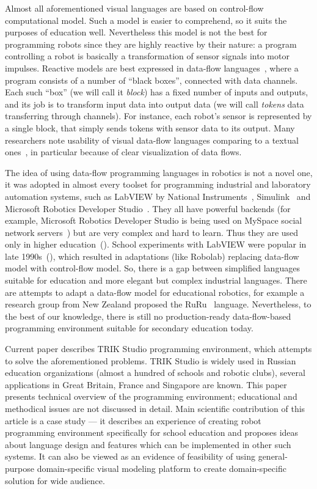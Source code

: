 \documentclass[conference]{IEEEtran}
\begin{document}
Almost all aforementioned visual languages are based on control-flow computational model. Such a model is easier to comprehend, so it suits the purposes of education well. Nevertheless this model is not the best for programming robots since they are highly reactive by their nature: a program controlling a robot is basically a transformation of sensor signals into motor impulses. Reactive models are best expressed in data-flow languages~\cite{johnston2004advances}, where a program consists of a number of ``black boxes'', connected with data channels. Each such ``box'' (we will call it \emph{block}) has a fixed number of inputs and outputs, and its job is to transform input data into output data (we will call \emph{tokens} data transferring through channels). For instance, each robot's sensor is represented by a single block, that simply sends tokens with sensor data to its output. Many researchers note usability of visual data-flow languages comparing to a textual ones~\cite{johnston2004advances}, in particular because of clear visualization of data flows.

The idea of using data-flow programming languages in robotics is not a novel one, it was adopted in almost every toolset for programming industrial and laboratory automation systems, such as LabVIEW by National Instruments~\cite{kodosky1991visual}, Simulink~\cite{dabney2004mastering} and Microsoft Robotics Developer Studio~\cite{jackson2007microsoft}. They all have powerful backends (for example, Microsoft Robotics Developer Studio is being used on MySpace social network servers~\cite{scherotter2009ccr}) but are very complex and hard to learn. Thus they are used only in higher education~(\cite{stefanovic2011labview,yi2005labview}). School experiments with LabVIEW were popular in late 1990s~(\cite{cyr1997low,portsmore1999robolab}), which resulted in adaptations (like Robolab) replacing data-flow model  with control-flow model. So, there is a gap between simplified languages suitable for education and more elegant but complex industrial languages. There are attempts to adapt a data-flow model for educational robotics, for example a research group from New Zealand proposed the RuRu~\cite{diprose2011ruru} language. Nevertheless, to the best of our knowledge, there is still no production-ready data-flow-based programming environment suitable for secondary education today.

Current paper describes TRIK Studio programming environment, which attempts to solve the aforementioned problems. TRIK Studio is widely used in Russian education organizations (almost a hundred of schools and robotic clubs), several applications in Great Britain, France and Singapore are known. This paper presents technical overview of the programming environment; educational and methodical issues are not discussed in detail. Main scientific contribution of this article is a case study --- it describes an experience of creating robot programming environment specifically for school education and proposes ideas about language design and features which can be implemented in other such systems. It can also be viewed as an evidence of feasibility of using general-purpose domain-specific visual modeling platform to create domain-specific solution for wide audience.
\end{document}
